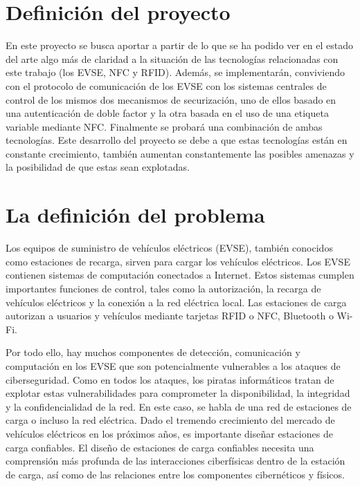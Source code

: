 \documentclass[12pt,a4paper,onecolumn,oneside]{report}
\begin{document}
\section{Definición del proyecto}

En este proyecto se busca aportar a partir de lo que se ha podido ver en el estado del arte algo más de claridad a la situación de las tecnologías relacionadas con este trabajo (los EVSE, NFC y RFID). Además, se implementarán, conviviendo con el protocolo de comunicación de los EVSE con los sistemas centrales de control de los mismos dos mecanismos de securización, uno de ellos basado en una autenticación de doble factor y la otra basada en el uso de una etiqueta variable mediante NFC. Finalmente se probará una combinación de ambas tecnologías. Este desarrollo del proyecto se debe a que estas tecnologías están en constante crecimiento, también aumentan constantemente las posibles amenazas y la posibilidad de que estas sean explotadas.


\section{La definición del problema}

Los equipos de suministro de vehículos eléctricos (EVSE), también conocidos como estaciones de recarga, sirven para cargar los vehículos eléctricos. Los EVSE contienen sistemas de computación conectados a Internet. Estos sistemas cumplen importantes funciones de control, tales como la autorización, la recarga de vehículos eléctricos y la conexión a la red eléctrica local. Las estaciones de carga autorizan a usuarios y vehículos mediante tarjetas RFID o NFC, Bluetooth o Wi-Fi.

Por todo ello, hay muchos componentes de detección, comunicación y computación en los EVSE que son potencialmente vulnerables a los ataques de ciberseguridad. Como en todos los ataques, los piratas informáticos tratan de explotar estas vulnerabilidades para comprometer la disponibilidad, la integridad y la confidencialidad de la red. En este caso, se habla de una red de estaciones de carga o incluso la red eléctrica. Dado el tremendo crecimiento del mercado de vehículos eléctricos en los próximos años, es importante diseñar estaciones de carga confiables. El diseño de estaciones de carga confiables necesita una comprensión más profunda de las interacciones ciberfísicas dentro de la estación de carga, así como de las relaciones entre los componentes cibernéticos y físicos. 
\end{document}
